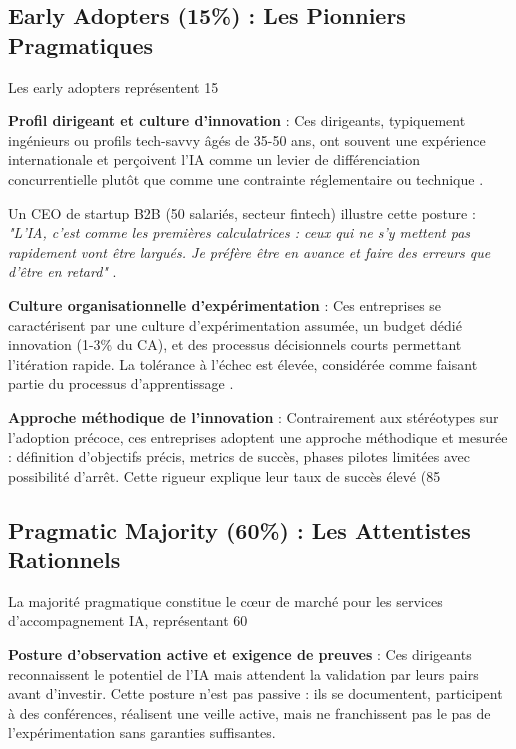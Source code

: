 \subsection{Early Adopters (15\%) : Les Pionniers Pragmatiques}

Les early adopters représentent 15%

\textbf{Profil dirigeant et culture d'innovation} : Ces dirigeants, typiquement ingénieurs ou profils tech-savvy âgés de 35-50 ans, ont souvent une expérience internationale et perçoivent l'IA comme un levier de différenciation concurrentielle plutôt que comme une contrainte réglementaire ou technique \cite{luwai2025meetings}.

Un CEO de startup B2B (50 salariés, secteur fintech) illustre cette posture : \emph{"L'IA, c'est comme les premières calculatrices : ceux qui ne s'y mettent pas rapidement vont être largués. Je préfère être en avance et faire des erreurs que d'être en retard"} \cite{luwai2025meetings}.

\textbf{Culture organisationnelle d'expérimentation} : Ces entreprises se caractérisent par une culture d'expérimentation assumée, un budget dédié innovation (1-3\% du CA), et des processus décisionnels courts permettant l'itération rapide. La tolérance à l'échec est élevée, considérée comme faisant partie du processus d'apprentissage \cite{christensen1997innovator}.

\textbf{Approche méthodique de l'innovation} : Contrairement aux stéréotypes sur l'adoption précoce, ces entreprises adoptent une approche méthodique et mesurée : définition d'objectifs précis, metrics de succès, phases pilotes limitées avec possibilité d'arrêt. Cette rigueur explique leur taux de succès élevé (85%

\subsection{Pragmatic Majority (60\%) : Les Attentistes Rationnels}

La majorité pragmatique constitue le cœur de marché pour les services d'accompagnement IA, représentant 60%

\textbf{Posture d'observation active et exigence de preuves} : Ces dirigeants reconnaissent le potentiel de l'IA mais attendent la validation par leurs pairs avant d'investir. Cette posture n'est pas passive : ils se documentent, participent à des conférences, réalisent une veille active, mais ne franchissent pas le pas de l'expérimentation sans garanties suffisantes.

